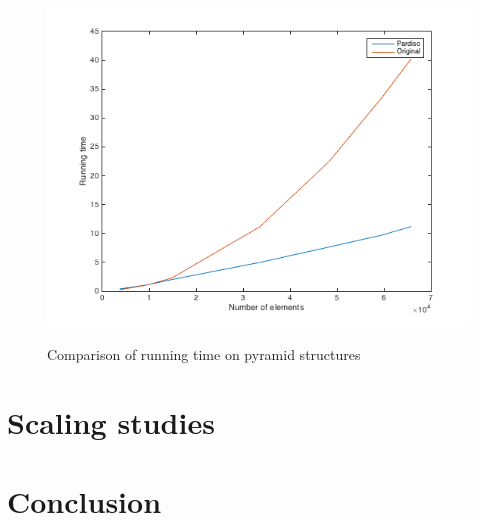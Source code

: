 \documentclass[11pt]{article}
\begin{document}
\begin{figure}[H]
\begin{center}

\caption{Comparison of running time on pyramid structures}
\includegraphics[width=12cm]{pyrplot}
\label{fig:pyr_comp}
\end{center}
\end{figure}



\section{Scaling studies}\label{sec:scaling}

\section{Conclusion}\label{sec:conclusion}
\end{document}
